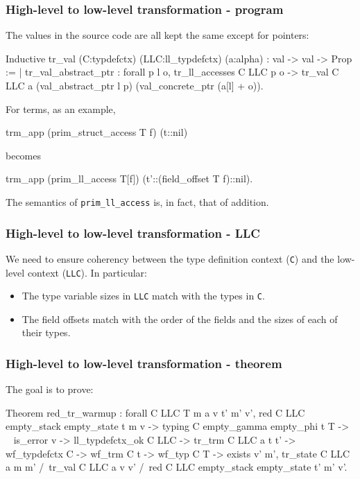 \begin{frame}[fragile]
\frametitle{High-level to low-level transformation - program}

The values in the source code  are all kept the same except for pointers:

\begin{coqs}
Inductive tr_val (C:typdefctx) (LLC:ll_typdefctx) (a:alpha) : val -> val -> Prop :=
	| tr_val_abstract_ptr : forall p l o,
      	tr_ll_accesses C LLC p o ->
      	tr_val C LLC a (val_abstract_ptr l p) (val_concrete_ptr (a[l] + o)).
\end{coqs}

\bigskip \pause

For terms, as an example,

\begin{coqs}
  trm_app (prim_struct_access T f) (t::nil)
\end{coqs}

becomes

\begin{coqs}
  trm_app (prim_ll_access T[f]) (t'::(field_offset T f)::nil).
\end{coqs}

\bigskip \pause

The semantics of \texttt{prim\_ll\_access} is, in fact, that of addition.

\end{frame}


\begin{frame}[fragile]
\frametitle{High-level to low-level transformation - LLC}

We need to ensure coherency between the type definition context (\texttt{C}) and the low-level context (\texttt{LLC}). In particular:

\begin{itemize}
	\item The type variable sizes in \texttt{LLC} match with the types in \texttt{C}.
	\item The field offsets match with the order of the fields and the sizes of each of their types.
\end{itemize}

\end{frame}


\begin{frame}[fragile]
\frametitle{High-level to low-level transformation - theorem}

The goal is to prove:
\begin{coq}
Theorem red_tr_warmup : forall C LLC T m a v t' m' v',
  red C LLC empty_stack empty_state t m v ->
  typing C empty_gamma empty_phi t T ->
  ~ is_error v ->
  ll_typdefctx_ok C LLC ->
  tr_trm C LLC a t t' ->
  wf_typdefctx C ->
  wf_trm C t ->
  wf_typ C T ->
  exists v' m',		tr_state C LLC a m m'
  		 /\ tr_val C LLC a v v'
  		 /\ red C LLC empty_stack empty_state t' m' v'.
\end{coq}

\end{frame}


